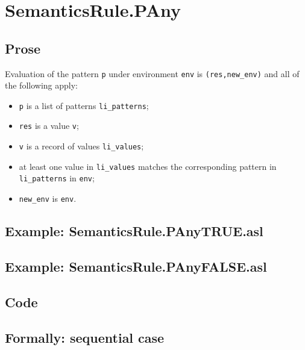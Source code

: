 \documentclass{book}
\begin{document}
\section{SemanticsRule.PAny \label{sec:SemanticsRule.PAny}}

    \subsection{Prose}
  Evaluation of the pattern \texttt{p} under environment \texttt{env} is
  \texttt{(res,new\_env)} and all of the following apply:
    \begin{itemize}
    \item \texttt{p} is a list of patterns \texttt{li\_patterns};
    \item \texttt{res} is a value \texttt{v};
    \item \texttt{v} is a record of values \texttt{li\_values};
    \item at least one value in \texttt{li\_values} matches the corresponding
pattern in \texttt{li\_patterns} in \texttt{env};
    \item \texttt{new\_env} is \texttt{env}.
    \end{itemize}

    \subsection{Example: SemanticsRule.PAnyTRUE.asl}

    \subsection{Example: SemanticsRule.PAnyFALSE.asl}

    \subsection{Code}

    \subsection{Formally: sequential case}
    \begin{align}
    \end{align} 
\end{document}
